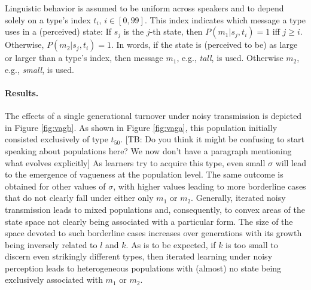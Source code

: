 \documentclass[10pt,a4paper]{article}
\newcommand{\tb}[1]{\textcolor[rgb]{.8,.33,.0}{[TB: #1]}}%
\begin{document}
Linguistic behavior is assumed to be uniform across speakers and to depend solely on a type's index $t_i$, $i \in [0,99]$. This index indicates which message a type uses in a (perceived) state: If $s_j$ is the $j$-th state, then $P(m_1|s_j,t_i) = 1$ iff $j \geq i$. Otherwise, $P(m_2|s_j,t_i) = 1$. In words, if the state is (perceived to be) as large or larger than a type's index, then message $m_1$, e.g., {\em tall}, is used. Otherwise $m_2$, e.g., {\em small}, is used.

\paragraph{Results.} The effects of a single generational turnover under noisy transmission is depicted in Figure \ref{fig:vagb}. As shown in Figure \ref{fig:vaga}, this population initially consisted exclusively of type $t_{50}$. \tb{Do you think it might be confusing to start speaking about populations here? We now don't have a paragraph mentioning what evolves explicitly} As learners try to acquire this type, even small $\sigma$ will lead to the emergence of vagueness at the population level. The same outcome is obtained for other values of $\sigma$, with higher values leading to more borderline cases that do not clearly fall under either only $m_1$ or $m_2$. Generally, iterated noisy transmission leads to mixed populations and, consequently, to convex areas of the state space not clearly being associated with a particular form. The size of the space devoted to such borderline cases increases over generations with its growth being inversely related to $l$ and $k$. As is to be expected, if $k$ is too small to discern even strikingly different types, then iterated learning under noisy perception leads to heterogeneous populations with (almost) no state being exclusively associated with $m_1$ or $m_2$.
\end{document}
